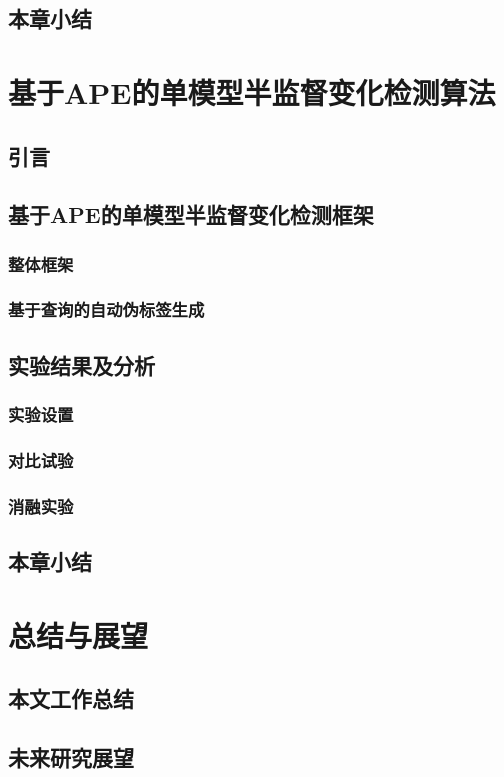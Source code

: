 \documentclass[lang=chs, degree=master, blindreview=false, adobe=false]{yanputhesis}
\begin{document}
\section{本章小结}

\chapter{基于APE的单模型半监督变化检测算法}
\section{引言}
\section{基于APE的单模型半监督变化检测框架}
\subsection{整体框架}
\subsection{基于查询的自动伪标签生成}
\section{实验结果及分析}
\subsection{实验设置}
\subsection{对比试验}
\subsection{消融实验}
\section{本章小结}

\chapter{总结与展望}
\section{本文工作总结}
\section{未来研究展望}
\end{document}
